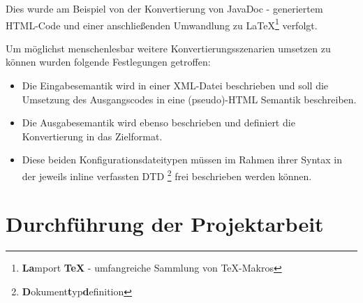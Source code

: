 \documentclass[	a4paper,		%
		titlepage, 		%
		fontsize=12pt		%
		]{scrartcl} 		%
\begin{document}
Dies wurde am Beispiel von der Konvertierung von JavaDoc - generiertem HTML-Code und einer anschließenden Umwandlung zu \LaTeX\footnote{\textbf{La}mport \textbf{TeX} - umfangreiche Sammlung von TeX-Makros} verfolgt.

Um möglichst menschenlesbar weitere Konvertierungsszenarien umsetzen zu können wurden folgende Festlegungen getroffen:
\begin{itemize}
 \item Die Eingabesemantik wird in einer XML-Datei beschrieben und soll die Umsetzung des Ausgangscodes in eine (pseudo)-HTML Semantik beschreiben.
 \item Die Ausgabesemantik wird ebenso beschrieben und definiert die Konvertierung in das Zielformat.
 \item Diese beiden Konfigurationsdateitypen müssen im Rahmen ihrer Syntax in der jeweils inline verfassten DTD \footnote{\textbf{D}okument\textbf{t}yp\textbf{d}efinition} frei beschrieben werden können.
\end{itemize}

\section{Durchführung der Projektarbeit}
\end{document}

